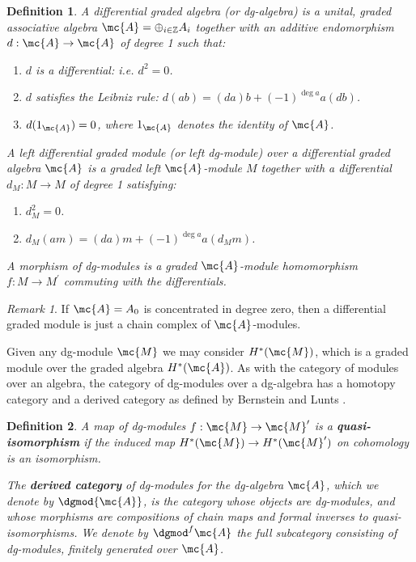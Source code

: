 \documentclass[12pt]{wart}
\newtheorem{defi}{Definition}
\theoremstyle{remark}
\newtheorem{remark}{Remark}
\begin{document}
\begin{defi} 
  A \emph{differential graded algebra} (or \emph{dg-algebra}) is a
  unital, graded associative algebra $\mc{A} = \oplus_{i \in \mathbb{Z}} A_i$
  together with an additive endomorphism $d : \mc{A} \to \mc{A}$ of degree 1 such
  that:
\begin{enumerate}
\item $d$ is a differential: i.e. $d^2 = 0$.
\item $d$ satisfies the Leibniz rule: $d(ab) = (da)b + (-1)^{\deg a} a(db)$.
\item $d(1_\mc{A}) = 0$, where $1_\mc{A}$ denotes the identity of $\mc{A}$.
\end{enumerate}
A \emph{left differential graded module} (or \emph{left dg-module}) over a differential graded algebra $\mc{A}$ is a graded left $\mc{A}$-module $M$ together with a differential $d_M : M \to M$ of degree 1 satisfying:
\begin{enumerate}
\item $d_M^2 = 0$.
\item $d_M(am) = (da)m + (-1)^{\deg a} a(d_Mm)$.
\end{enumerate}
A morphism of dg-modules is a graded $\mc{A}$-module homomorphism $f: M \to
M^\prime$ commuting with the differentials.
\end{defi}

\begin{remark} 
  If $\mc{A} = A_0$ is concentrated in degree zero, then a
  differential graded module is just a chain complex of
  $\mc{A}$-modules. 
\end{remark}
Given any dg-module $\mc{M}$ we may consider $H^*(\mc{M})$, which is a
graded module over the graded algebra $H^*(\mc{A})$.  As with the
category of modules over an algebra, the category of dg-modules over a
dg-algebra has a homotopy category and a derived category as defined by Bernstein and Lunts \cite{BL}.

\begin{defi}
  A map of dg-modules $f:\mc{M}\to \mc{M}'$ is a {\bf quasi-isomorphism} if the induced map $H^*(\mc{M})\to H^*(\mc{M}')$ on cohomology is an isomorphism.

  The {\bf derived category} of dg-modules for the dg-algebra $\mc{A}$, which we
  denote by $\dgmod{\mc{A}}$, is the category whose objects are dg-modules,
  and whose morphisms are compositions of chain maps and formal
  inverses to quasi-isomorphisms. We denote by $\dgmod^f{\mc{A}}$ the full
  subcategory consisting of dg-modules, finitely generated over $\mc{A}$.
\end{defi}
\end{document}

